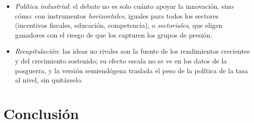 \documentclass[11pt]{article}
\begin{document}
\begin{itemize}
\begin{itemize}
  \item \emph{instituciones}: la protección de la propiedad, la seguridad jurídica y la apertura al cambio son las condiciones de  para que la innovación sea continua .
  \end{itemize}
\item \emph{Política industrial}: el debate no es solo cuánto apoyar la innovación, sino cómo: con instrumentos \emph{horizontales}, iguales para todos los sectores (incentivos fiscales, educación, competencia), o \emph{sectoriales}, que eligen ganadores con el riesgo de que los capturen los grupos de presión.
\item \emph{Recapitulación}: las ideas no rivales son la fuente de los rendimientos crecientes y del crecimiento sostenido; su efecto escala no se ve en los datos de la posguerra, y la versión semiendógena traslada el peso de la política de la tasa al nivel, sin quitárselo.
\end{itemize}

\section*{Conclusión}
\end{document}
